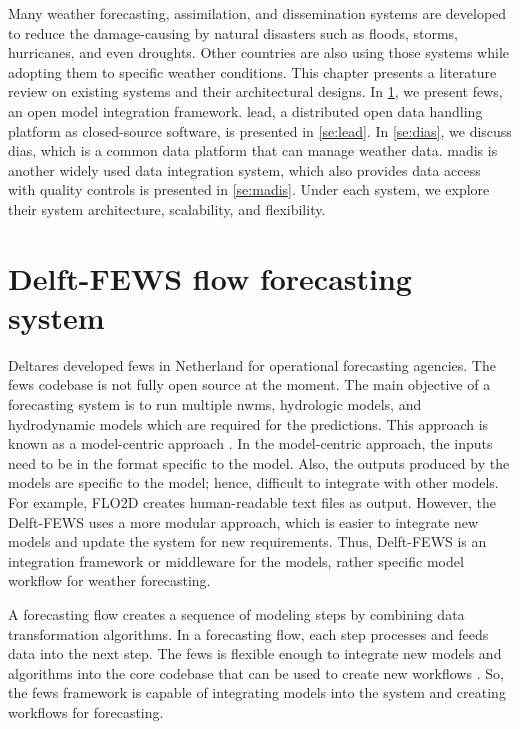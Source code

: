 Many weather forecasting, assimilation, and dissemination systems are developed to reduce the damage-causing by natural disasters such as floods, storms, hurricanes, and even droughts. Other countries are also using those systems while adopting them to specific weather conditions. This chapter presents a literature review on existing systems and their architectural designs. In \cref{se:fews}, we present \acrfull{fews}, an open model integration framework. \acrfull{lead}, a distributed open data handling platform as closed-source software, is presented in \cref{se:lead}. In \cref{se:dias}, we discuss \acrfull{dias}, which is a common data platform that can manage weather data. \acrfull{madis} is another widely used data integration system, which also provides data access with quality controls is presented in \cref{se:madis}. Under each system, we explore their system architecture, scalability, and flexibility.

\section{Delft-FEWS flow forecasting system}
\label{se:fews}

Deltares developed \acrshort{fews} \cite{Werner2013TheSystem} in Netherland for operational forecasting agencies. The \acrshort{fews} codebase is not fully open source at the moment. The main objective of a forecasting system is to run multiple \acrshort{nwms}, hydrologic models, and hydrodynamic models which are required for the predictions. This approach is known as a model-centric approach \cite{Werner2005FloodCatchments}. In the model-centric approach, the inputs need to be in the format specific to the model. Also, the outputs produced by the models are specific to the model; hence, difficult to integrate with other models. For example, FLO2D creates human-readable text files as output. However, the Delft-FEWS uses a more modular approach, which is easier to integrate new models and update the system for new requirements. Thus, Delft-FEWS is an integration framework or middleware for the models, rather specific model workflow for weather forecasting.

A forecasting flow creates a sequence of modeling steps by combining data transformation algorithms. In a forecasting flow, each step processes and feeds data into the next step. The \acrshort{fews} is flexible enough to integrate new models and algorithms into the core codebase that can be used to create new workflows \cite{Werner2013TheSystem}. So, the \acrshort{fews} framework is capable of integrating models into the system and creating workflows for forecasting.

